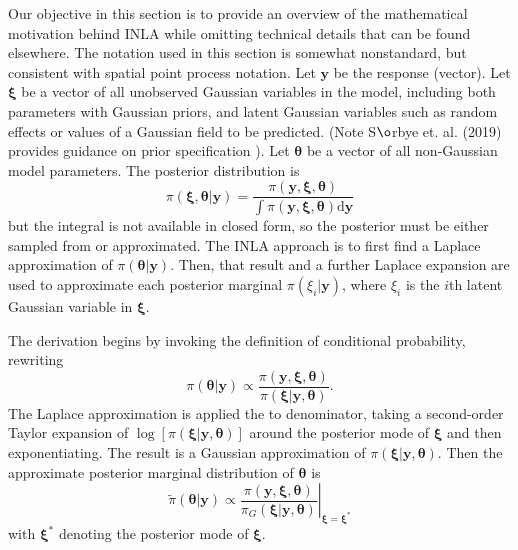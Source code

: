 \documentclass{interact}
\begin{document}
Our objective in this section is to provide an overview of the mathematical
motivation behind INLA while omitting technical details that can be found
elsewhere. The notation used in this section is somewhat nonstandard, but
consistent with spatial point process notation. Let \(\mathbf{y}\) be the
response (vector). Let \(\boldsymbol{\xi}\) be a vector of all unobserved
Gaussian variables in the model, including both parameters with Gaussian
priors, and latent Gaussian variables such as random effects or values of a
Gaussian field to be predicted. (Note S$\o$rbye et. al. (2019) provides guidance on prior specification \cite{s2019}). Let \(\boldsymbol{\theta}\) be a vector of all
non-Gaussian model parameters. The posterior distribution is
\begin{equation}
\pi\left(\boldsymbol{\xi}, \boldsymbol{\theta}| \mathbf{y}\right)
= \frac{\pi\left(\mathbf{y}, \boldsymbol{\xi}, \boldsymbol{\theta}\right)}
{\int \pi\left(\mathbf{y}, \boldsymbol{\xi}, \boldsymbol{\theta}\right)
\mathrm{d}\mathbf{y}}
\end{equation}
but the integral is not available in closed form, so the posterior must be
either sampled from or approximated. The INLA approach is to first find a
Laplace approximation of \(\pi\left(\boldsymbol{\theta} | \mathbf{y}\right)\).
Then, that result and a further Laplace expansion are used to approximate each
posterior marginal \(\pi\left(\xi_{i}| \mathbf{y}\right)\), where \(\xi_{i}\)
is the \(i\)th latent Gaussian variable in \(\boldsymbol{\xi}\).

The derivation begins by invoking the definition of conditional probability,
rewriting
\begin{equation}
\pi\left(\boldsymbol{\theta} | \mathbf{y}\right)
\propto \frac{\pi\left(\mathbf{y}, \boldsymbol{\xi}, \boldsymbol{\theta}\right)}
{\pi\left(\boldsymbol{\xi} | \mathbf{y}, \boldsymbol{\theta}\right)}.
\end{equation}
The Laplace approximation is applied the to denominator, taking a second-order
Taylor expansion of
\(\log\left[\pi\left(\boldsymbol{\xi} | \mathbf{y}, \boldsymbol{\theta}\right)\right]\)
around the posterior mode of \(\boldsymbol{\xi}\) and then exponentiating. The
result is a Gaussian approximation of
\(\pi\left(\boldsymbol{\xi} | \mathbf{y}, \boldsymbol{\theta}\right)\). Then
the approximate posterior marginal distribution of \(\boldsymbol{\theta}\) is
\begin{equation}
\tilde{\pi}\left(\boldsymbol{\theta} | \mathbf{y}\right)
\propto \left.\frac{\pi\left(\mathbf{y}, \boldsymbol{\xi}, \boldsymbol{\theta}\right)}
{\pi_{G}\left(\boldsymbol{\xi} | \mathbf{y}, \boldsymbol{\theta}\right)}
\right|_{\boldsymbol{\xi}=\boldsymbol{\xi}^{*}}
\end{equation}
with \(\boldsymbol{\xi}^{*}\) denoting the posterior mode of
\(\boldsymbol{\xi}\).
\end{document}
